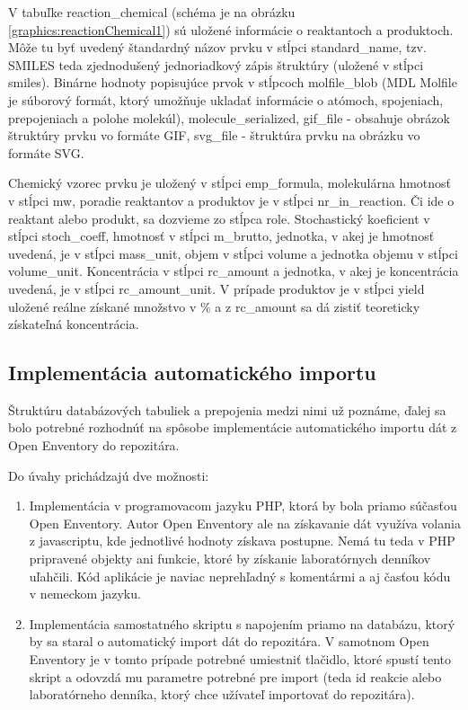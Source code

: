 \documentclass[thesis=M,slovak]{FITthesis}[2013/05/06]
\begin{document}
V tabuľke reaction\_chemical (schéma je na obrázku \ref{graphics:reactionChemical1}) sú uložené informácie o reaktantoch a produktoch. Môže tu byť uvedený štandardný názov prvku v stĺpci standard\_name, tzv. SMILES teda zjednodušený jednoriadkový zápis štruktúry (uložené v stĺpci smiles). Binárne hodnoty popisujúce prvok v stĺpcoch molfile\_blob (MDL Molfile je súborový formát, ktorý umožňuje ukladať informácie o atómoch, spojeniach, prepojeniach a polohe molekúl), molecule\_serialized, gif\_file - obsahuje obrázok štruktúry prvku vo formáte GIF, svg\_file - štruktúra prvku na obrázku vo formáte SVG.

Chemický vzorec prvku je uložený v stĺpci emp\_formula, molekulárna hmotnosť v stĺpci mw, poradie reaktantov a produktov je v stĺpci nr\_in\_reaction. Či ide o reaktant alebo produkt, sa dozvieme zo stĺpca role. Stochastický koeficient v stĺpci stoch\_coeff, hmotnosť v stĺpci m\_brutto, jednotka, v akej je hmotnosť uvedená, je v stĺpci mass\_unit, objem v stĺpci volume a jednotka objemu v stĺpci volume\_unit. Koncentrácia v stĺpci rc\_amount a jednotka, v akej je koncentrácia uvedená, je v stĺpci rc\_amount\_unit.
V prípade produktov je v stĺpci yield uložené reálne získané množstvo v \% a z rc\_amount sa dá zistiť teoreticky získateľná koncentrácia.

\subsection{Implementácia automatického importu}
Štruktúru databázových tabuliek a prepojenia medzi nimi už poznáme, ďalej sa bolo potrebné rozhodnúť na spôsobe implementácie automatického importu dát z Open Enventory do repozitára.

Do úvahy prichádzajú dve možnosti:
\begin{enumerate}
	\item Implementácia v programovacom jazyku PHP, ktorá by bola priamo súčasťou Open Enventory. Autor Open Enventory ale na získavanie dát využíva volania z javascriptu, kde jednotlivé hodnoty získava postupne. Nemá tu teda v PHP pripravené objekty ani funkcie, ktoré by získanie laboratórnych denníkov uľahčili. Kód aplikácie je naviac neprehľadný s komentármi a aj časťou kódu v nemeckom jazyku.
	\item Implementácia samostatného skriptu s napojením priamo na databázu, ktorý by sa staral o automatický import dát do repozitára. V samotnom Open Enventory je v tomto prípade potrebné umiestniť tlačidlo, ktoré spustí tento skript a odovzdá mu parametre potrebné pre import (teda id reakcie alebo laboratórneho denníka, ktorý chce užívateľ importovať do repozitára).
\end{enumerate}
\end{document}
